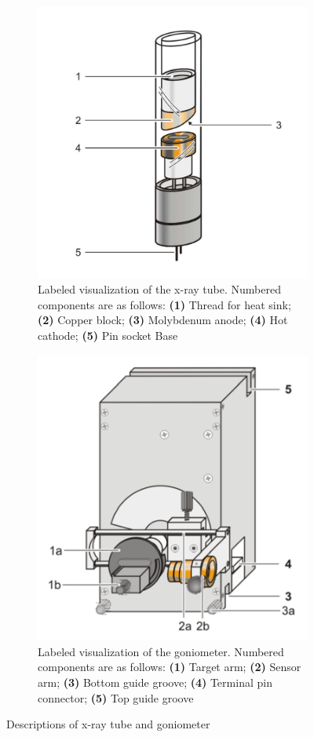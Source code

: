 \documentclass[twocolumn]{article}
\newcommand{\bd}{\textbf}
\begin{document}
			\begin{figure}[h!]
				\begin{subfigure}{.45\textwidth}
					\begin{center}
						\includegraphics[width = .5\textwidth]{x-ray tube}
					\end{center}
					\caption{Labeled visualization of the x-ray tube. Numbered components are as follows: \bd{(1)} Thread for heat sink; \bd{(2)} Copper block; \bd{(3)} Molybdenum anode; \bd{(4)} Hot cathode; \bd{(5)} Pin socket Base }
					\label{x-ray tube}
				\end{subfigure}
				\hspace{.05\textwidth}
				\begin{subfigure}{.45\textwidth}
					\begin{center}
						\includegraphics[width = .5\textwidth]{goniometer}
					\end{center}
					\caption{Labeled visualization of the goniometer. Numbered components are as follows: \bd{(1)} Target arm; \bd{(2)} Sensor arm; \bd{(3)} Bottom guide groove; \bd{(4)} Terminal pin connector; \bd{(5)} Top guide groove }
					\label{goniometer}
				\end{subfigure}
				\caption{Descriptions of x-ray tube and goniometer}
			\end{figure}
\end{document}
